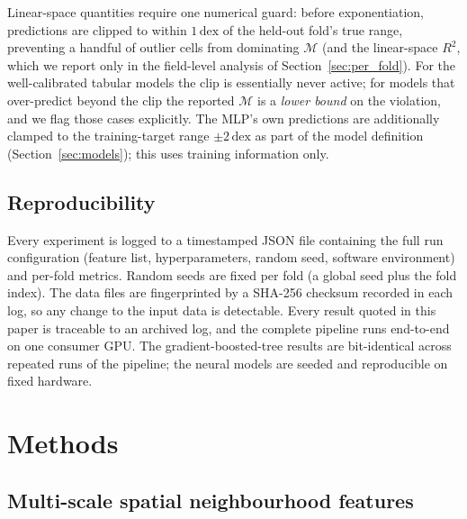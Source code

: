 \documentclass[fleqn,usenatbib]{rasti}
\newcommand{\dex}{\,\text{dex}}
\newcommand{\Rsq}{R^2}
\newcommand{\Mratio}{\mathcal{M}}
\begin{document}
Linear-space quantities require one numerical guard: before
exponentiation, predictions are clipped to within \(1\dex\) of the
held-out fold's true range, preventing a handful of outlier cells from
dominating \(\Mratio\) (and the linear-space \(\Rsq\), which we report only
in the field-level analysis of Section~\ref{sec:per_fold}). For the
well-calibrated tabular models the clip is essentially never active;
for models that over-predict beyond the clip the reported \(\Mratio\) is a
\emph{lower bound} on the violation, and we flag those cases
explicitly. The MLP's own predictions are additionally clamped to the
training-target range \(\pm 2\dex\) as part of the model definition
(Section~\ref{sec:models}); this uses training information only.

\subsection{Reproducibility}
\label{sec:repro}

Every experiment is logged to a timestamped JSON file containing the
full run configuration (feature list, hyperparameters, random seed,
software environment) and per-fold metrics. Random seeds are fixed per
fold (a global seed plus the fold index). The data files are
fingerprinted by a SHA-256 checksum recorded in each log, so any change
to the input data is detectable. Every result quoted in this paper is
traceable to an archived log, and the complete pipeline runs end-to-end
on one consumer GPU. The gradient-boosted-tree results are bit-identical
across repeated runs of the pipeline; the neural models are seeded and
reproducible on fixed hardware.

\section{Methods}
\label{sec:methods}

\subsection{Multi-scale spatial neighbourhood features}
\label{sec:spatial}
\end{document}
